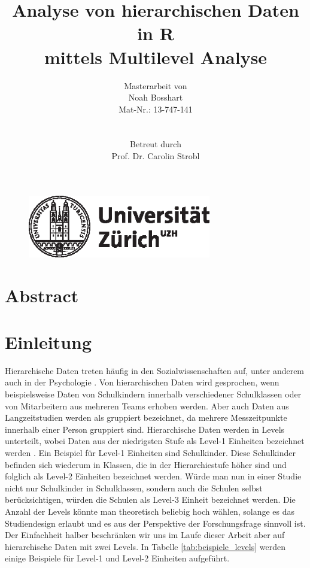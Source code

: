 \documentclass[12pt]{article}\usepackage[]{graphicx}\usepackage[]{color}
\title{Analyse von hierarchischen Daten in R \\ mittels Multilevel Analyse}
\author{Masterarbeit von \\ Noah Bosshart \\ Mat-Nr.: 13-747-141 \\ \\ \\ Betreut durch \\ Prof. Dr. Carolin Strobl}
\numberwithin{equation}{section}
\begin{document}
\begin{figure}[t]
  \centering
  \includegraphics[width = 8cm]{uzh_logo}
\end{figure}

\maketitle
\thispagestyle{empty}

\newpage
{}
\tableofcontents

\newpage
\listoffigures

\newpage
\listoftables
\newpage


\section{Abstract}
\newpage

\section{Einleitung}
Hierarchische Daten treten häufig in den Sozialwissenschaften auf, unter anderem auch in der Psychologie \citep{SnijdersTomA.B2012Ma:a}. Von hierarchischen Daten wird gesprochen, wenn beispielsweise Daten von Schulkindern innerhalb verschiedener Schulklassen oder von Mitarbeitern aus mehreren Teams erhoben werden. Aber auch Daten aus Langzeitstudien werden als gruppiert bezeichnet, da mehrere Messzeitpunkte innerhalb einer Person gruppiert sind. Hierarchische Daten werden in Levels unterteilt, wobei Daten aus der niedrigsten Stufe als Level-1 Einheiten bezeichnet werden \citep{SnijdersTomA.B2012Ma:a}. Ein Beispiel für Level-1 Einheiten sind Schulkinder. Diese Schulkinder befinden sich wiederum in Klassen, die in der Hierarchiestufe höher sind und folglich als Level-2 Einheiten bezeichnet werden. Würde man nun in einer Studie nicht nur Schulkinder in Schulklassen, sondern auch  die Schulen selbst berücksichtigen, würden die Schulen als Level-3 Einheit bezeichnet werden. Die Anzahl der Levels könnte man theoretisch beliebig hoch wählen, solange es das Studiendesign erlaubt und es aus der Perspektive der Forschungsfrage sinnvoll ist. Der Einfachheit halber beschränken wir uns im Laufe dieser Arbeit aber auf hierarchische Daten mit zwei Levels. In Tabelle \ref{tab:beispiele_levels} werden einige Beispiele für Level-1 und Level-2 Einheiten aufgeführt. 
\end{document}
